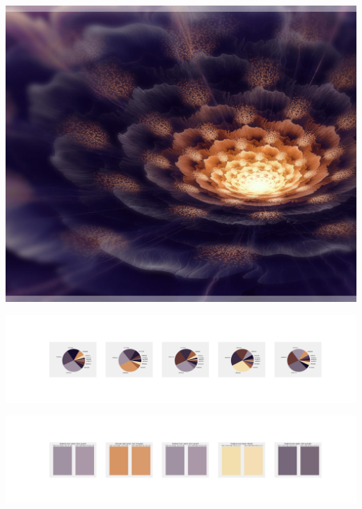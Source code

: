 \documentclass[11pt]{article}
\begin{document}
\begin{landscape}
    \begin{center}
    \includegraphics[width=\textwidth]{./nbimg/file (162).jpg}
    \end{center}

    \begin{center}
    \includegraphics[width=250mm]{./nbimg/pie-70.jpg}
    \end{center}

    \begin{center}
    \includegraphics[width=250mm]{./nbimg/peak-70.jpg}
    \end{center}
    


\end{landscape}
\end{document}

